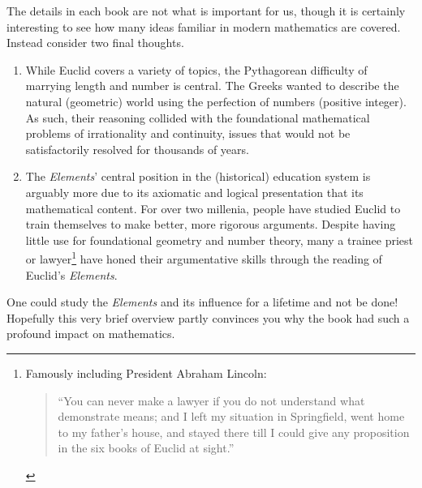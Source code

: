 The details in each book are not what is important for us, though it is certainly interesting to see how many ideas familiar in modern mathematics are covered. Instead consider two final thoughts.
\begin{enumerate}
  \item While Euclid covers a variety of topics, the Pythagorean difficulty of marrying length and number is central. The Greeks wanted to describe the natural (geometric) world using the perfection of numbers (positive integer). As such, their reasoning collided with the foundational mathematical problems of irrationality and continuity, issues that would not be satisfactorily resolved for thousands of years.
  \item The \emph{Elements}' central position in the (historical) education system is arguably more due to its axiomatic and logical presentation that its mathematical content. For over two millenia, people have studied Euclid to train themselves to make better, more rigorous arguments. Despite having little use for foundational geometry and number theory, many a trainee priest or lawyer\footnote{%
  Famously including President Abraham Lincoln:
  \begin{quote}
  	``You can never make a lawyer if you do not understand what demonstrate means; and I left my situation in Springfield, went home to my father's house, and stayed there till I could give any proposition in the six books of Euclid at sight.''
  \end{quote}
}
have honed their argumentative skills through the reading of Euclid's \emph{Elements}.
\end{enumerate}

One could study the \emph{Elements} and its influence for a lifetime and not be done! Hopefully this very brief overview partly convinces you why the book had such a profound impact on mathematics.


\bigskip\bigskip\bigskip

\pagebreak[3]



